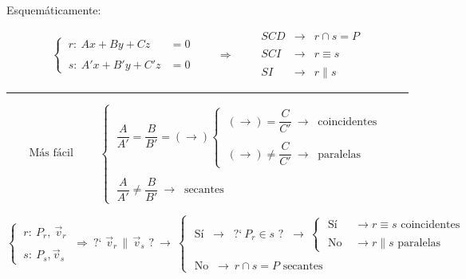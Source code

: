 \vspace{3mm} Esquemáticamente:


\begin{theorem} 

$$\begin{cases} \ r:\ Ax+By+Cz&=0 \\ \\ \ s:\ A'x+B'y+C'z&=0 \end{cases} \qquad \Rightarrow \qquad  \begin{array}{llc} SCD & \to & r\cap s=P \\ \\ SCI &\to & r\equiv s \\ \\ SI &\to & r\parallel s \end{array}$$

\begin{center}
\rule{250pt}{0.1pt}	
\end{center}


$$\text{Más fácil } \qquad  \begin{cases} 
 \ \dfrac A{A'}=\dfrac{B}{B'}=(\to) 
 \begin{cases}
 \ (\to)=\dfrac{C}{C'} \ \to \ \text{ coincidentes}
 \\ \\
  \ (\to)\neq \dfrac{C}{C'} \ \to \ \text{ paralelas}
 \end{cases}
 \\ \\
 \ \dfrac A{A'} \neq \dfrac{B}{B'} \ \to \ \text{ secantes}	
 \end{cases}$$

\end{theorem}



\begin{theorem} 

$$\begin{cases} \ r:\ P_r,\ \vec v_r \\ \\ \ s:\ P_s, \vec v_s \end{cases} \ \Rightarrow \ 
\text{?` } \vec v_r \, \parallel \, \vec v_s \text{\ ?} \ \to \
\begin{cases}
	\text{ Sí } 
\ \to \ \text{ ?`} \ P_r \in s \text{ ? } \ \to \
		\begin{cases}
		\text{ Sí}     &\to r\equiv s \text{ coincidentes}
		\\ \\ \text{ No } &\to r\parallel s \text{ paralelas}
		\end{cases}	
\\ \\ \text{ No }\ \to \ r\cap s=P \text{ secantes}
\end{cases}$$
	
\end{theorem}

